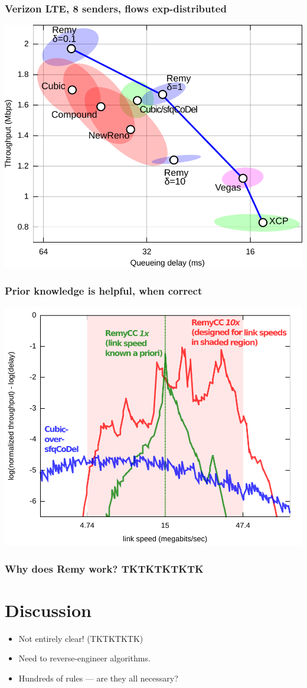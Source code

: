 \documentclass[svgnames]{beamer}
\begin{document}
\begin{frame}
\frametitle{Verizon LTE, 8 senders, flows exp-distributed}

\noindent \includegraphics[width=8.5 cm]{vzw-8-final.pdf}

\end{frame}

\begin{frame}
\frametitle{Prior knowledge is helpful, when correct}

\noindent \includegraphics[width=8.5 cm]{spec2.pdf}

\end{frame}

\begin{frame}
\frametitle{Why does Remy work? TKTKTKTKTK}

\section{Discussion}

\begin{itemize}
\item Not entirely clear! (TKTKTKTK)

\item Need to reverse-engineer algorithms.

\item Hundreds of rules --- are they all necessary?
\end{itemize}

\end{frame}
\end{document}
